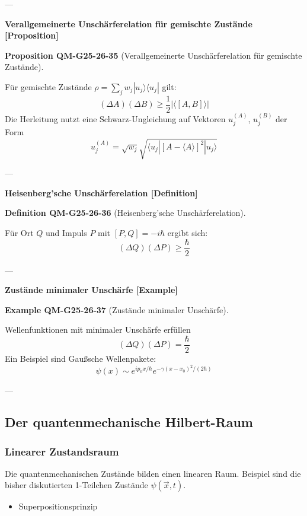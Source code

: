 \documentclass[10pt, letterpaper]{article}
\newcommand{\CustomHeading}[3]{%
  \par\medskip\noindent%
  \textbf{#1 #2} \textnormal{(#3)}.\enskip%
}
\newenvironment{DEF}[2]{\begin{unitbox}\CustomHeading{Definition}{#1}{#2}}{\end{unitbox}}
\newenvironment{PROP}[2]{\begin{unitbox}\CustomHeading{Proposition}{#1}{#2}}{\end{unitbox}}
\newenvironment{EXA}[2]{\begin{unitbox}\CustomHeading{Example}{#1}{#2}}{\end{unitbox}}
\begin{document}
---

\textbf{Verallgemeinerte Unschärferelation für gemischte Zustände [Proposition]}

\begin{PROP}{QM-G25-26-35}{Verallgemeinerte Unschärferelation für gemischte Zustände}
Für gemischte Zustände $\rho = \sum_j w_j |u_j\rangle \langle u_j|$ gilt:
\[
(\Delta A)(\Delta B) \geq \frac{1}{2} |\langle [A, B] \rangle|
\]
Die Herleitung nutzt eine Schwarz-Ungleichung auf Vektoren $u_j^{(A)}$, $u_j^{(B)}$ der Form
\[
u_j^{(A)} = \sqrt{w_j} \sqrt{ \langle u_j | [A - \langle A \rangle]^2 | u_j \rangle }
\]
\end{PROP}

---

\textbf{Heisenberg’sche Unschärferelation [Definition]}

\begin{DEF}{QM-G25-26-36}{Heisenberg’sche Unschärferelation}
Für Ort $Q$ und Impuls $P$ mit $[P, Q] = -i\hbar$ ergibt sich:
\[
(\Delta Q)(\Delta P) \geq \frac{\hbar}{2}
\]
\end{DEF}

---

\textbf{Zustände minimaler Unschärfe [Example]}

\begin{EXA}{QM-G25-26-37}{Zustände minimaler Unschärfe}
Wellenfunktionen mit minimaler Unschärfe erfüllen
\[
(\Delta Q)(\Delta P) = \frac{\hbar}{2}
\]
Ein Beispiel sind Gaußsche Wellenpakete:
\[
\psi(x) \sim e^{ip_0 x/\hbar} e^{-\gamma(x - x_0)^2 / (2\hbar)}
\]
\end{EXA}

---







\subsection*{Der quantenmechanische Hilbert-Raum}




\subsubsection*{Linearer Zustandsraum}
Die quantenmechanischen Zustände bilden einen linearen Raum. Beispiel sind die bisher diskutierten 1-Teilchen Zustände $\psi(\vec{x}, t)$.

\begin{itemize}
  \item Superpositionsprinzip
\end{itemize}
\end{document}
